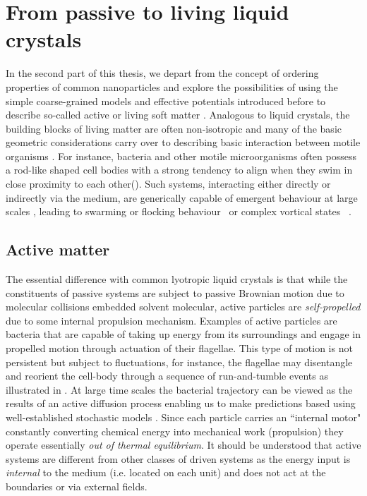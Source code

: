 \documentclass[amssymb]{revtex4}
\begin{document}
\section{From passive to living liquid crystals}


In the second part of this thesis, we depart from the concept of ordering properties of common nanoparticles and explore the possibilities of using the simple coarse-grained models and effective potentials introduced before to describe so-called active or living  soft matter \cite{2010ramaswamy, marchetti_rmp2013}. 
Analogous to  liquid crystals, the building blocks of living matter are often non-isotropic and many of the basic geometric considerations  carry over to describing basic interaction between motile organisms \cite{baskaran}. For instance, bacteria and other motile microorganisms often possess a rod-like shaped cell bodies with a strong tendency to align when they swim in close proximity to each other().  Such systems, interacting either directly or indirectly via the medium, are generically capable of emergent behaviour at large scales \cite{2009CoWe,2011KochSub,2009SoAr,2011drescheretal}, leading to swarming or flocking behaviour~\cite{2010kearns,2010ramaswamy} or complex vortical states ~\cite{2000Be,2004DoEtAl,2007SoEtAl,2005Riedel_Science,2008SaintillanShelley}. 


\subsection{Active matter}

The essential difference with common lyotropic liquid crystals is that while the constituents of passive systems are subject to passive Brownian motion due to molecular collisions embedded solvent molecular, active particles are {\em self-propelled}  due to some internal propulsion mechanism.
Examples of active particles are bacteria that are capable of taking up energy from its surroundings and engage in propelled motion through actuation of their flagellae. This type of motion is not persistent but subject to fluctuations, for instance, the flagellae may disentangle and reorient the cell-body through a sequence of run-and-tumble events as illustrated in .   At large time scales the bacterial trajectory can be viewed as the results of an active diffusion process enabling us to make predictions based using well-established stochastic  models \cite{2012pawel_review}. Since each particle carries an ``internal motor" constantly converting chemical energy into mechanical work (propulsion) they operate essentially {\em out of thermal equilibrium}. It should be understood that active systems are different from other classes of driven systems as the energy input is {\em internal} to the medium (i.e. located on each unit) and  does not act at the boundaries or via external fields.
\end{document}

